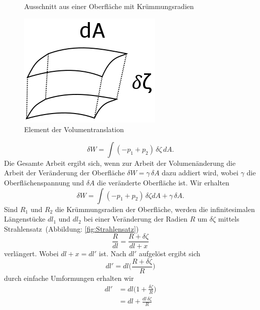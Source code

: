 \begin{refsection}
\begin{figure}
  \caption{Ausschnitt aus einer Oberfläche mit Krümmungsradien} 
  \label{fig:YoungCone}
\end{figure}
\begin{figure}
  \centering
  \includegraphics[scale=0.3]{minimal/Volumetranslation.png}
  \caption{Element der Volumentranslation} 
  \label{fig:Volumentransaltion}
\end{figure}
\begin{equation}
\delta W=\int(-p_1+p_2)\,\delta\zeta\,dA.
\end{equation}
Die Gesamte Arbeit ergibt sich, wenn zur Arbeit der Volumenänderung die Arbeit der Veränderung der Oberfläche $\delta W=\gamma \, \delta A $ dazu addiert wird, wobei $\gamma$ die Oberflächenspannung und $\delta A$ die veränderte Oberfläche ist. Wir erhalten
\begin{equation}\label{YL-Arbeit_1}
\delta W=\int(-p_1+p_2)\,\delta\zeta dA + \gamma \,\delta A.
\end{equation}
Sind $R_1$ und $R_2$ die Krümmungsradien der Oberfläche, werden die infinitesimalen Längenstücke $dl_1$ und $dl_2$ bei einer Veränderung der Radien $R$ um $\delta\zeta$ mittels Strahlensatz \,(Abbildung: \ref{fig:Strahlensatz})
\begin{equation}
\frac{R}{dl}=\frac{R+\delta\zeta}{dl+x}
\end{equation}
verlängert. Wobei $dl+x=dl'$ ist. Nach $dl'$ aufgelöst ergibt sich
\begin{equation}
dl' = dl\bigg(\frac{R+\delta\zeta}{R}\bigg)
\end{equation}
durch einfache Umformungen erhalten wir
\begin{equation}
\begin{split}
dl' &= dl\bigg(1+\frac{\delta\zeta}{R}\bigg)\\
&=dl+\frac{dl\,\delta\zeta}{R}
\end{split}
\end{equation}
\begin{figure}
  \centering

\end{figure}
\end{refsection}

